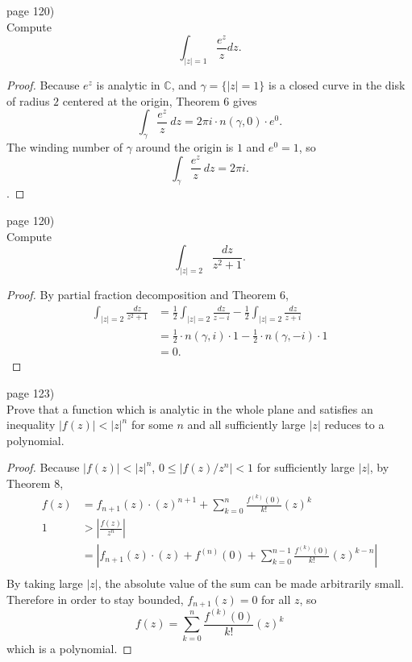 \documentclass{article}
\newenvironment{problem}[2][Problem]{\begin{trivlist}
\item[\hskip \labelsep {\bfseries #1}\hskip \labelsep {\bfseries #2.}]}{\end{trivlist}}
\begin{document}
\begin{problem}{1} (page 120) \\
  Compute \[
    \int_{|z| = 1} \frac{e^z}{z} dz.
  \]
\end{problem}

\begin{proof}
  Because $e^z$ is analytic in $\mathbb{C}$, and $\gamma = \{|z| = 1\}$ is a
  closed curve in the disk of radius $2$ centered at the origin, Theorem 6 gives
  \[
    \int_\gamma \frac{e^z}{z}\ dz = 2\pi i \cdot n(\gamma, 0) \cdot e^0.
  \]
  The winding number of $\gamma$ around the origin is $1$ and $e^0 = 1$, so
  \[
    \int_\gamma \frac{e^z}{z}\ dz = 2\pi i.
  \].
\end{proof}

\pagebreak

\begin{problem}{3} (page 120) \\
  Compute \[
    \int_{|z|=2}\frac{dz}{z^2 + 1}.
  \]
\end{problem}

\begin{proof}
  By partial fraction decomposition and Theorem 6, \begin{align*}
    \int_{|z|=2}\frac{dz}{z^2 + 1} &= \frac{1}{2}\int_{|z|=2}\frac{dz}{z - i} -
    \frac{1}{2}\int_{|z|=2}\frac{dz}{z + i}\\
    &= \frac{1}{2}\cdot n(\gamma, i)\cdot 1 - \frac{1}{2}\cdot n(\gamma, -i)\cdot 1 \\
    &= 0.
  \end{align*}
\end{proof}

\pagebreak

\begin{problem}{2} (page 123) \\
  Prove that a function which is analytic in the whole plane and satisfies an
  inequality $|f(z)| < |z|^n$ for some $n$ and all sufficiently large $|z|$
  reduces to a polynomial.
\end{problem}

\begin{proof}
  Because $|f(z)| < |z|^n$, $0 \leq |f(z)/z^n| < 1$ for sufficiently large $|z|$,
  by Theorem 8, \begin{align*}
    f(z) &= f_{n+1}(z)\cdot(z)^{n+1} + \sum_{k = 0}^{n} \frac{f^{(k)}(0)}{k!}(z)^k \\
    1 &> \left|\frac{f(z)}{z^n}\right|\\
    &= \left|f_{n+1}(z)\cdot(z) + f^{(n)}(0) + \sum_{k = 0}^{n-1} \frac{f^{(k)}(0)}{k!}(z)^{k-n}\right| \\
  \end{align*}
  By taking large $|z|$, the absolute value of the sum can be made arbitrarily
  small. Therefore in order to stay bounded, $f_{n+1}(z) = 0$ for all $z$, so \[
    f(z) = \sum_{k = 0}^{n} \frac{f^{(k)}(0)}{k!}(z)^k
  \] which is a polynomial.
\end{proof}
\end{document}
